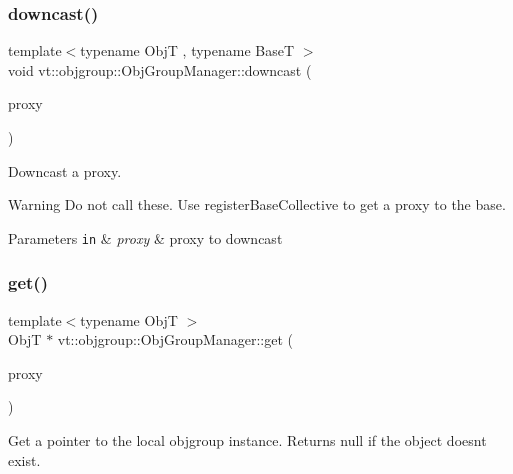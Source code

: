 \subsubsection{\texorpdfstring{downcast()}{downcast()}}
{\footnotesize\ttfamily template$<$typename ObjT , typename BaseT $>$ \\
void vt\+::objgroup\+::\+Obj\+Group\+Manager\+::downcast (\begin{DoxyParamCaption}\item[{\hyperlink{structvt_1_1objgroup_1_1_obj_group_manager_aea65eef52f240a52210132eef5ce591f}{Proxy\+Type}$<$ ObjT $>$}]{proxy }\end{DoxyParamCaption})}



Downcast a proxy. 

\begin{DoxyWarning}{Warning}
Do not call these. Use {\ttfamily register\+Base\+Collective} to get a proxy to the base.
\end{DoxyWarning}

\begin{DoxyParams}[1]{Parameters}
\mbox{\tt in}  & {\em proxy} & proxy to downcast \\
\hline
\end{DoxyParams}
\mbox{\label{structvt_1_1objgroup_1_1_obj_group_manager_a4b11402fc31ca40e1dd2eacb65101e2b}} 
\subsubsection{\texorpdfstring{get()}{get()}\hspace{0.1cm}{\footnotesize\ttfamily [1/2]}}
{\footnotesize\ttfamily template$<$typename ObjT $>$ \\
ObjT $\ast$ vt\+::objgroup\+::\+Obj\+Group\+Manager\+::get (\begin{DoxyParamCaption}\item[{\hyperlink{structvt_1_1objgroup_1_1_obj_group_manager_aea65eef52f240a52210132eef5ce591f}{Proxy\+Type}$<$ ObjT $>$}]{proxy }\end{DoxyParamCaption})}



Get a pointer to the local objgroup instance. Returns null if the object doesn\textquotesingle{}t exist. 


